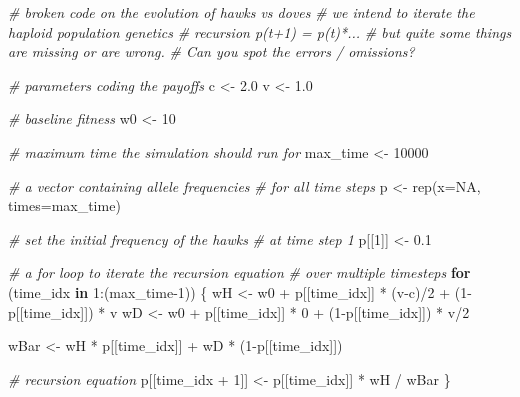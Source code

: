 \documentclass[
]{book}
\newenvironment{Shaded}{\begin{snugshade}}{\end{snugshade}}
\newcommand{\AttributeTok}[1]{\textcolor[rgb]{0.77,0.63,0.00}{#1}}
\newcommand{\CommentTok}[1]{\textcolor[rgb]{0.56,0.35,0.01}{\textit{#1}}}
\newcommand{\ConstantTok}[1]{\textcolor[rgb]{0.00,0.00,0.00}{#1}}
\newcommand{\ControlFlowTok}[1]{\textcolor[rgb]{0.13,0.29,0.53}{\textbf{#1}}}
\newcommand{\DecValTok}[1]{\textcolor[rgb]{0.00,0.00,0.81}{#1}}
\newcommand{\FloatTok}[1]{\textcolor[rgb]{0.00,0.00,0.81}{#1}}
\newcommand{\FunctionTok}[1]{\textcolor[rgb]{0.00,0.00,0.00}{#1}}
\newcommand{\NormalTok}[1]{#1}
\newcommand{\OtherTok}[1]{\textcolor[rgb]{0.56,0.35,0.01}{#1}}
\newcommand{\SpecialCharTok}[1]{\textcolor[rgb]{0.00,0.00,0.00}{#1}}
\begin{document}
\begin{Shaded}
\begin{Highlighting}[]
\CommentTok{\# broken code on the evolution of hawks vs doves}
\CommentTok{\# we intend to iterate the haploid population genetics}
\CommentTok{\# recursion p(t+1) = p(t)*...}
\CommentTok{\# but quite some things are missing or are wrong.}
\CommentTok{\# Can you spot the errors / omissions?}

\CommentTok{\# parameters coding the payoffs}
\NormalTok{c }\OtherTok{\textless{}{-}} \FloatTok{2.0}
\NormalTok{v }\OtherTok{\textless{}{-}} \FloatTok{1.0}

\CommentTok{\# baseline fitness}
\NormalTok{w0 }\OtherTok{\textless{}{-}} \DecValTok{10}

\CommentTok{\# maximum time the simulation should run for}
\NormalTok{max\_time }\OtherTok{\textless{}{-}} \DecValTok{10000}

\CommentTok{\# a vector containing allele frequencies}
\CommentTok{\# for all time steps}
\NormalTok{p }\OtherTok{\textless{}{-}} \FunctionTok{rep}\NormalTok{(}\AttributeTok{x=}\ConstantTok{NA}\NormalTok{, }\AttributeTok{times=}\NormalTok{max\_time)}

\CommentTok{\# set the initial frequency of the hawks}
\CommentTok{\# at time step 1}
\NormalTok{p[[}\DecValTok{1}\NormalTok{]] }\OtherTok{\textless{}{-}} \FloatTok{0.1}

\CommentTok{\# a for loop to iterate the recursion equation}
\CommentTok{\# over multiple timesteps}
\ControlFlowTok{for}\NormalTok{ (time\_idx }\ControlFlowTok{in} \DecValTok{1}\SpecialCharTok{:}\NormalTok{(max\_time}\DecValTok{{-}1}\NormalTok{))}
\NormalTok{\{}
\NormalTok{  wH }\OtherTok{\textless{}{-}}\NormalTok{ w0 }\SpecialCharTok{+}\NormalTok{ p[[time\_idx]] }\SpecialCharTok{*}\NormalTok{ (v}\SpecialCharTok{{-}}\NormalTok{c)}\SpecialCharTok{/}\DecValTok{2} \SpecialCharTok{+}\NormalTok{ (}\DecValTok{1}\SpecialCharTok{{-}}\NormalTok{p[[time\_idx]]) }\SpecialCharTok{*}\NormalTok{ v}
\NormalTok{  wD }\OtherTok{\textless{}{-}}\NormalTok{ w0 }\SpecialCharTok{+}\NormalTok{ p[[time\_idx]] }\SpecialCharTok{*} \DecValTok{0} \SpecialCharTok{+}\NormalTok{ (}\DecValTok{1}\SpecialCharTok{{-}}\NormalTok{p[[time\_idx]]) }\SpecialCharTok{*}\NormalTok{ v}\SpecialCharTok{/}\DecValTok{2}
  
\NormalTok{  wBar }\OtherTok{\textless{}{-}}\NormalTok{ wH }\SpecialCharTok{*}\NormalTok{ p[[time\_idx]] }\SpecialCharTok{+}\NormalTok{ wD }\SpecialCharTok{*}\NormalTok{ (}\DecValTok{1}\SpecialCharTok{{-}}\NormalTok{p[[time\_idx]])}
  
  \CommentTok{\# recursion equation}
\NormalTok{  p[[time\_idx }\SpecialCharTok{+} \DecValTok{1}\NormalTok{]] }\OtherTok{\textless{}{-}}\NormalTok{ p[[time\_idx]] }\SpecialCharTok{*}\NormalTok{ wH }\SpecialCharTok{/}\NormalTok{ wBar}
\NormalTok{\}}
\end{Highlighting}
\end{Shaded}
\end{document}
